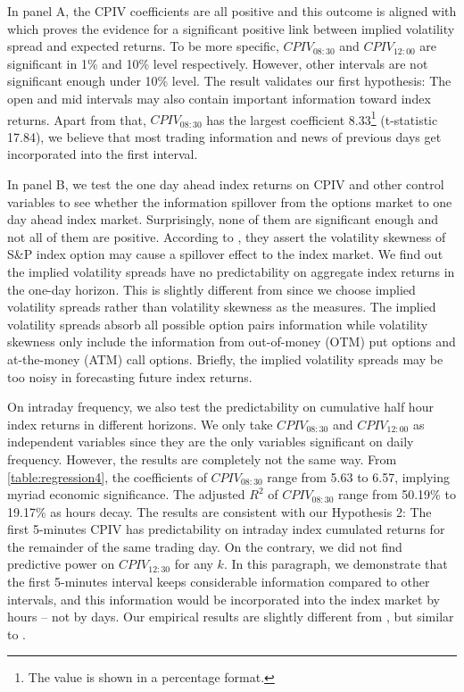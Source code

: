 In panel A, the CPIV coefficients are all positive and this outcome is aligned with \textcite{cremers2010deviations} which proves the evidence for a significant positive link between implied volatility spread and expected returns. To be more specific, $CPIV_{08:30}$ and $CPIV_{12:00}$ are significant in 1\% and 10\% level respectively. However, other intervals are not significant enough under 10\% level. The result validates our first hypothesis: The open and mid intervals may also contain important information toward index returns. Apart from that, $CPIV_{08:30}$ has the largest coefficient 8.33\footnote{The value is shown in a percentage format.} (t-statistic 17.84), we believe that most trading information and news of previous days get incorporated into the first interval.

In panel B, we test the one day ahead index returns on CPIV and other control variables to see whether the information spillover from the options market to one day ahead index market. Surprisingly, none of them are significant enough and not all of them are positive. According to \textcite{atilgan2015implied}, they assert the volatility skewness of S\&P index option may cause a spillover effect to the index market. We find out the implied volatility spreads have no predictability on aggregate index returns in the one-day horizon. This is slightly different from \textcite{atilgan2015implied} since we choose implied volatility spreads rather than volatility skewness as the measures. The implied volatility spreads absorb all possible option pairs information while volatility skewness only include the information from out-of-money (OTM) put options and at-the-money (ATM) call options. Briefly, the implied volatility spreads may be too noisy in forecasting future index returns.  

On intraday frequency, we also test the predictability on cumulative half hour index returns in different horizons. We only take $CPIV_{08:30}$ and $CPIV_{12:00}$ as independent variables since they are the only variables significant on daily frequency. However, the results are completely not the same way. From \autoref{table:regression4}, the coefficients of $CPIV_{08:30}$ range from 5.63 to 6.57, implying myriad economic significance. The adjusted $R^{2}$ of $CPIV_{08:30}$ range from 50.19\% to 19.17\% as hours decay. The results are consistent with our Hypothesis 2: The first 5-minutes CPIV has predictability on intraday index cumulated returns for the remainder of the same trading day. On the contrary, we did not find predictive power on $CPIV_{12:30}$ for any $k$. In this paragraph, we demonstrate that the first 5-minutes interval keeps considerable information compared to other intervals, and this information would be incorporated into the index market by hours -- not by days. Our empirical results are slightly different from \textcite{cremers2010deviations}, but similar to \textcite{kumar1992behavior}. 
   





